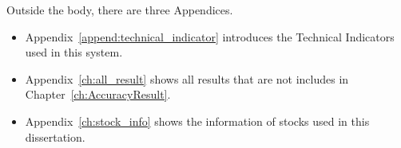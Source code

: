 Outside the body, there are three Appendices.
\begin{itemize}
	\item Appendix~\ref{append:technical_indicator} introduces the Technical Indicators used in this system.
	\item Appendix~\ref{ch:all_result} shows all results that are not includes in Chapter~\ref{ch:AccuracyResult}.
	\item Appendix~\ref{ch:stock_info} shows the information of stocks used in this dissertation.
\end{itemize}



